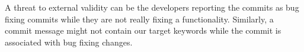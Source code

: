 A threat to external validity can be the developers reporting the commits as bug fixing commits while they are not really fixing a functionality. Similarly, a commit message might not contain our target keywords while the commit is associated with bug fixing changes.
